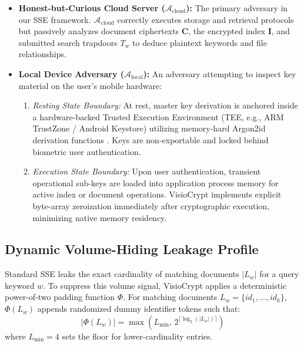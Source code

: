 \documentclass[runningheads]{llncs}
\begin{document}
\begin{itemize}
    \item \textbf{Honest-but-Curious Cloud Server ($\mathcal{A}_{\text{cloud}}$):} The primary adversary in our SSE framework. $\mathcal{A}_{\text{cloud}}$ correctly executes storage and retrieval protocols but passively analyzes document ciphertexts $\mathbf{C}$, the encrypted index $\mathbf{I}$, and submitted search trapdoors $T_w$ to deduce plaintext keywords and file relationships.
    \item \textbf{Local Device Adversary ($\mathcal{A}_{\text{local}}$):} An adversary attempting to inspect key material on the user's mobile hardware:
    \begin{enumerate}
        \item \textit{Resting State Boundary:} At rest, master key derivation is anchored inside a hardware-backed Trusted Execution Environment (TEE, e.g., ARM TrustZone \cite{pinto2019,rustee2020} / Android Keystore) utilizing memory-hard Argon2id derivation functions \cite{biryukov2016}. Keys are non-exportable and locked behind biometric user authentication.
        \item \textit{Execution State Boundary:} Upon user authentication, transient operational sub-keys are loaded into application process memory for active index or document operations. VisioCrypt implements explicit byte-array zeroization immediately after cryptographic execution, minimizing native memory residency.
    \end{enumerate}
\end{itemize}

\subsection{Dynamic Volume-Hiding Leakage Profile}
Standard SSE leaks the exact cardinality of matching documents $|L_w|$ for a query keyword $w$. To suppress this volume signal, VisioCrypt applies a deterministic power-of-two padding function $\Phi$. For matching documents $L_w = \{id_1, \dots, id_k\}$, $\Phi(L_w)$ appends randomized dummy identifier tokens such that:
\begin{equation}
|\Phi(L_w)| = \max \left( L_{\min}, \, 2^{\lceil \log_2(|L_w|) \rceil} \right)
\end{equation}
where $L_{\min} = 4$ sets the floor for lower-cardinality entries. 
\end{document}
